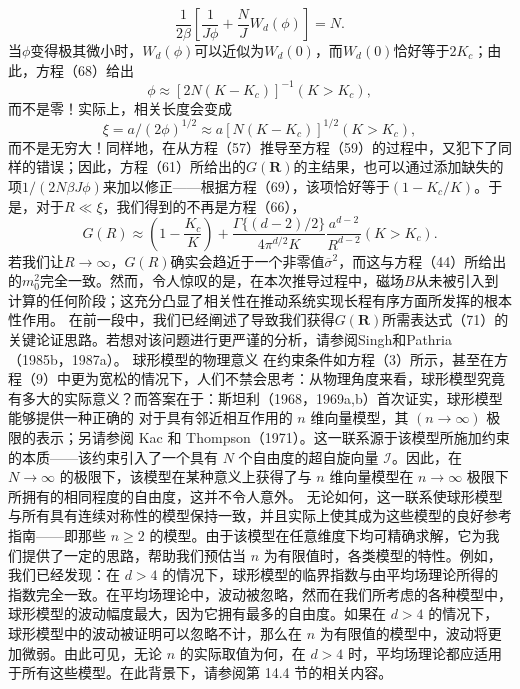 \begin{equation}\tag{13.4.101}\label{eq:13.4.101}
\frac { 1 } { 2 \beta } \left[ \frac { 1 } { J \phi } + \frac { N } { J } W _ { d } ( \phi ) \right] = N .
\end{equation}
当\(\phi\)变得极其微小时，\(W_{d}(\phi)\)可以近似为\(W_{d}(0)\)，而\(W_{d}(0)\)恰好等于\(2K_{c}\)；由此，方程（68）给出
\begin{equation}\tag{13.4.102}\label{eq:13.4.102}
\phi \approx [ 2 N ( K - K _ { c } ) ] ^{- 1}  ( K > K _ { c } ) ,
\end{equation}
而不是零！实际上，相关长度会变成
\begin{equation}\tag{13.4.103}\label{eq:13.4.103}
\xi = a / ( 2 \phi ) ^{1 / 2} \approx a [ N ( K - K _ { c } ) ] ^{1 / 2}  ( K > K _ { c } ) ,
\end{equation}
而不是无穷大！同样地，在从方程（57）推导至方程（59）的过程中，又犯下了同样的错误；因此，方程（61）所给出的\(G(\boldsymbol{R})\)的主结果，也可以通过添加缺失的项\(1/(2N\beta J\phi)\)来加以修正——根据方程（69），该项恰好等于\((1-K_c/K)\)。于是，对于\(R \ll \xi\)，我们得到的不再是方程（66），
\begin{equation}\tag{13.4.104}\label{eq:13.4.104}
G ( R ) \approx \left( 1 - \frac { K _ { c } } { K } \right) + \frac { \Gamma \{ ( d - 2 ) / 2 \} } { 4 \pi ^{d / 2} K } \frac { a ^{d - 2} } { R ^{d - 2} }  ( K > K _ { c } ) .
\end{equation}
若我们让\(R \to \infty\)，\(G(R)\)确实会趋近于一个非零值\(\overline{\sigma}^2\)，而这与方程（44）所给出的\(m_0^2\)完全一致。然而，令人惊叹的是，在本次推导过程中，磁场\(B\)从未被引入到计算的任何阶段；这充分凸显了相关性在推动系统实现长程有序方面所发挥的根本性作用。
在前一段中，我们已经阐述了导致我们获得\(G(\mathbf{R})\)所需表达式（71）的关键论证思路。若想对该问题进行更严谨的分析，请参阅Singh和Pathria（1985b，1987a）。
球形模型的物理意义
在约束条件如方程（3）所示，甚至在方程（9）中更为宽松的情况下，人们不禁会思考：从物理角度来看，球形模型究竟有多大的实际意义？而答案在于：斯坦利（1968，1969a,b）首次证实，球形模型能够提供一种正确的
对于具有邻近相互作用的 \(n\) 维向量模型，其 \((n\to\infty)\) 极限的表示；另请参阅 Kac 和 Thompson（1971）。这一联系源于该模型所施加约束的本质——该约束引入了一个具有 \(N\) 个自由度的超自旋向量 \(\mathcal{I}\)。因此，在 \(N\to\infty\) 的极限下，该模型在某种意义上获得了与 \(n\) 维向量模型在 \(n\to\infty\) 极限下所拥有的相同程度的自由度，这并不令人意外。
无论如何，这一联系使球形模型与所有具有连续对称性的模型保持一致，并且实际上使其成为这些模型的良好参考指南——即那些 \(n \geq 2\) 的模型。由于该模型在任意维度下均可精确求解，它为我们提供了一定的思路，帮助我们预估当 \(n\) 为有限值时，各类模型的特性。例如，我们已经发现：在 \(d > 4\) 的情况下，球形模型的临界指数与由平均场理论所得的指数完全一致。在平均场理论中，波动被忽略，然而在我们所考虑的各种模型中，球形模型的波动幅度最大，因为它拥有最多的自由度。如果在 \(d > 4\) 的情况下，球形模型中的波动被证明可以忽略不计，那么在 \(n\) 为有限值的模型中，波动将更加微弱。由此可见，无论 \(n\) 的实际取值为何，在 \(d > 4\) 时，平均场理论都应适用于所有这些模型。在此背景下，请参阅第 14.4 节的相关内容。
